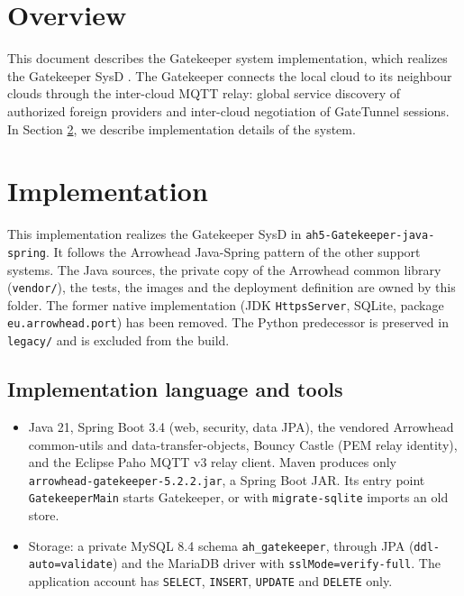 \documentclass[a4paper]{arrowhead}
\begin{document}
\section{Overview}
\label{sec:overview}

This document describes the Gatekeeper system implementation, which realizes the Gatekeeper SysD \cite{gk-sysd}. The Gatekeeper connects the local cloud to its neighbour clouds through the inter-cloud MQTT relay: global service discovery of authorized foreign providers and inter-cloud negotiation of GateTunnel sessions.
In Section \ref{Implementation}, we describe implementation details of the system.

\newpage

\section{Implementation}
\label{Implementation}

This implementation realizes the Gatekeeper SysD in \texttt{ah5-\allowbreak{}Gatekeeper-\allowbreak{}java-\allowbreak{}spring}. It follows the Arrowhead Java-Spring pattern of the other support systems. The Java sources, the private copy of the Arrowhead common library (\texttt{vendor/}), the tests, the images and the deployment definition are owned by this folder. The former native implementation (JDK \texttt{HttpsServer}, SQLite, package \texttt{eu.\allowbreak{}arrowhead.\allowbreak{}port}) has been removed. The Python predecessor is preserved in \texttt{legacy/\allowbreak{}} and is excluded from the build.

\subsection{Implementation language and tools}
\begin{itemize}
\item Java 21, Spring Boot 3.4 (web, security, data JPA), the vendored Arrowhead common-utils and data-transfer-objects, Bouncy Castle (PEM relay identity), and the Eclipse Paho MQTT v3 relay client. Maven produces only \texttt{arrowhead-\allowbreak{}gatekeeper-\allowbreak{}5.2.2.jar}, a Spring Boot JAR. Its entry point \texttt{GatekeeperMain} starts Gatekeeper, or with \texttt{migrate-\allowbreak{}sqlite} imports an old store.
\item Storage: a private MySQL 8.4 schema \texttt{ah\_\allowbreak{}gatekeeper}, through JPA (\texttt{ddl-\allowbreak{}auto=validate}) and the MariaDB driver with \texttt{sslMode=verify-\allowbreak{}full}. The application account has \texttt{SELECT}, \texttt{INSERT}, \texttt{UPDATE} and \texttt{DELETE} only.
\end{itemize}
\end{document}
